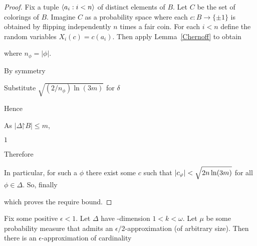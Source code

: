 \documentclass[creche.tex]{subfiles}
\begin{document}
\begin{proof}
Fix a tuple $\<a_i:i<n\>$ of distinct elements of $B$. Let $C$ be the set of colorings of $B$. Imagine $C$ as a probability space where each $c:B\to\{\pm1\}$ is obtained by flipping independently $n$ times a fair coin. For each $i<n$ define the random variables $X_i(c)=c(a_i)$. Then apply Lemma~\ref{Chernoff} to obtain 

\hfill where $n_\phi=|\phi|$.

By symmetry


Substitute $\sqrt{(2/n_\phi)\ln(3m)}$ for $\delta$



Hence


As $|\Delta\mathord\restriction B|\le m$, 

\medrel{<}$1$

Therefore


In particular, for such a $\phi$ there exist some $c$ such that $|c_\phi|<\sqrt{2n\ln(3m)\strut}$ for all $\phi\in\Delta$. So, finally 


which proves the require bound.
\end{proof}







\begin{theorem}\label{thm_epsilon_approx}
Fix some positive $\epsilon<1$. Let $\Delta$ have \vc-dimension $1<k<\omega$. Let $\mu$ be some probability measure that admits an $\epsilon/2$-approximation (of arbitrary size). Then there is an $\epsilon$-approximation of cardinality 


\end{theorem}
\end{document}
